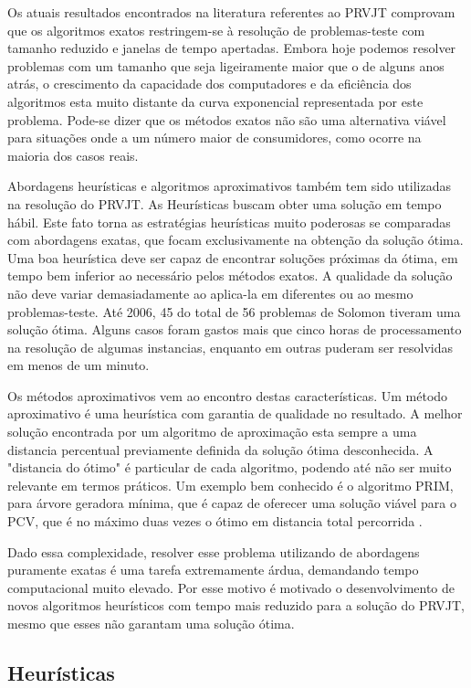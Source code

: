 Os atuais resultados encontrados na literatura referentes ao PRVJT comprovam que os algoritmos exatos restringem-se à resolução de problemas-teste com tamanho reduzido e janelas de tempo apertadas. Embora hoje podemos resolver problemas com um tamanho que seja ligeiramente maior que o de alguns anos atrás, o crescimento da capacidade dos computadores e da eficiência dos algoritmos esta muito distante da curva exponencial representada por este problema. Pode-se dizer que os métodos exatos não são uma alternativa viável para situações onde a um número maior de consumidores, como ocorre na maioria dos casos reais. \cite{Chabrier}

Abordagens heurísticas e algoritmos aproximativos também tem sido utilizadas na resolução do PRVJT. As Heurísticas buscam obter uma solução em tempo hábil. Este fato torna as estratégias heurísticas muito poderosas se comparadas com abordagens exatas, que focam exclusivamente na obtenção da solução ótima. Uma boa heurística deve ser capaz de encontrar soluções próximas da ótima, em tempo bem inferior ao necessário pelos métodos exatos. A qualidade da solução não deve variar demasiadamente ao aplica-la em diferentes ou ao mesmo problemas-teste. Até 2006, 45 do total de 56 problemas de Solomon tiveram uma solução ótima. Alguns casos foram gastos mais que cinco horas de processamento na resolução de algumas instancias, enquanto em outras puderam ser resolvidas em menos de um minuto. ~\cite{Jepsen}

Os métodos aproximativos vem ao encontro destas características. Um método aproximativo é uma heurística com garantia de qualidade no resultado. A melhor solução encontrada por um algoritmo de aproximação esta sempre a uma distancia percentual previamente definida da solução ótima desconhecida. A "distancia do ótimo" é particular de cada algoritmo, podendo até não ser muito relevante em termos práticos. Um exemplo bem conhecido é o algoritmo PRIM, para árvore geradora mínima, que é capaz de oferecer uma solução viável para o PCV, que é no máximo duas vezes o ótimo em distancia total percorrida \cite{Alvarenga}.

Dado essa complexidade, resolver esse problema utilizando de abordagens puramente exatas é uma tarefa extremamente árdua, demandando tempo computacional muito elevado. Por esse motivo é motivado o desenvolvimento de novos algoritmos heurísticos com tempo mais reduzido para a solução do PRVJT, mesmo que esses não garantam uma solução ótima.

\subsection{Heurísticas}

